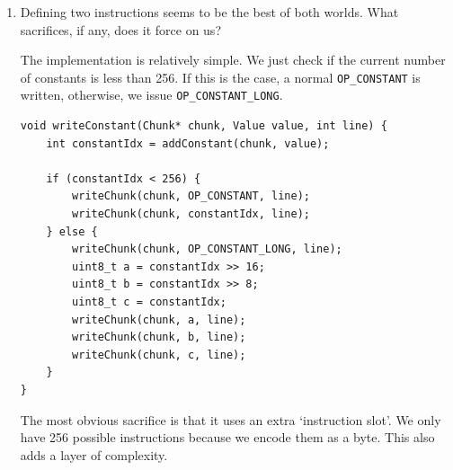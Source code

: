 \documentclass{article}
\begin{document}
\begin{enumerate}
{\begin{verbatim}
    // assume that lines is homotopic increasing.
    if (chunk->lineCount == 0) {
        chunk->lines[0] = 1;
        chunk->lines[1] = line;
        chunk->lineCount = 2;
        // printf("init lines\n");
    } else if (line == chunk->lines[chunk->lineCount - 1])  {
        chunk->lines[chunk->lineCount - 2]++;
        // printf("incr lines\n");
    } else {
        chunk->lines[chunk->lineCount] = 1;
        chunk->lines[chunk->lineCount + 1] = line;
        chunk->lineCount += 2;
        printf("new  lines\n");
    }
}
        \end{verbatim}

        Now, we just do a linear search for `getLine'.
        \begin{verbatim}
int getLine(Chunk* chunk, int offset) {
    int codeIdx = 0;
    int lineIdx = 0;
    while (codeIdx < offset) {
        codeIdx++;
        if (chunk->lines[lineIdx] == 0) {
            lineIdx += 2;
        } else {
            chunk->lines[lineIdx]--;
        }
    }

    return chunk->lines[lineIdx + 1];
}
        \end{verbatim}
    }

    \item {
        Defining two instructions seems to be the best of both worlds. What sacrifices, if any, does it force on us?

        The implementation is relatively simple. We just check if the current 
        number of constants is less than 256. If this is the case, a normal 
        \verb|OP_CONSTANT| is written, otherwise, we issue \verb|OP_CONSTANT_LONG|.

        \begin{verbatim}
void writeConstant(Chunk* chunk, Value value, int line) {
    int constantIdx = addConstant(chunk, value);

    if (constantIdx < 256) {
        writeChunk(chunk, OP_CONSTANT, line);
        writeChunk(chunk, constantIdx, line);
    } else {
        writeChunk(chunk, OP_CONSTANT_LONG, line);
        uint8_t a = constantIdx >> 16;
        uint8_t b = constantIdx >> 8;
        uint8_t c = constantIdx;
        writeChunk(chunk, a, line);
        writeChunk(chunk, b, line);
        writeChunk(chunk, c, line);
    }
}
        \end{verbatim}

        The most obvious sacrifice is that it uses an extra 
        `instruction slot'. We only have 256 possible 
        instructions because we encode them as a byte.
        This also adds a layer of complexity.
    }


\end{enumerate}
\end{document}
